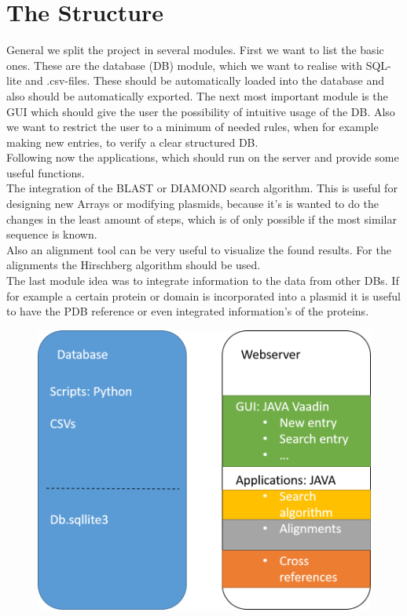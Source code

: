 \documentclass[]{article}
\begin{document}
\section{ The Structure}
General we split the project in several modules. First we want to list the basic ones. These are the database (DB) module, which we want to realise with SQL-lite and .csv-files. These should be automatically loaded into the database and also should be automatically exported.
The next most important module is the GUI which should give the user the possibility of intuitive usage of the DB. Also we want to restrict the user to a minimum of needed rules, when for example making new entries, to verify a clear structured DB.\\
Following now the applications, which should run on the server and provide some useful functions.\\
The integration of the BLAST or DIAMOND search algorithm. This is useful for designing new Arrays or modifying plasmids, because it's is wanted to do the changes in the least amount of steps, which is of only possible if the most similar sequence is known.\\
Also an alignment tool can be very useful to visualize the found results. For the alignments the Hirschberg algorithm should be used.\\
The last module idea was to integrate information to the data from other DBs. If for example a certain protein or domain is incorporated into a plasmid it is useful to have the PDB reference or even integrated information’s of the proteins.

	\begin{figure}[h]
		\includegraphics[width=\textwidth]{img/Structure.png}
	\end{figure}
\end{document}
